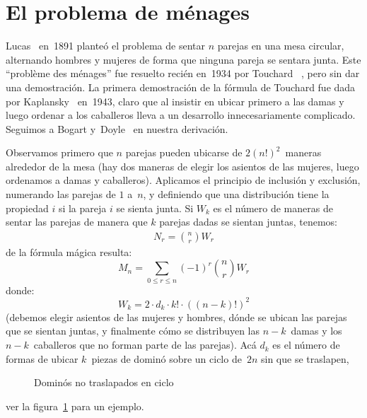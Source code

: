 \section{El problema de ménages}
\label{sec:menages}

  Lucas~\cite{lucas91:_theo_nombres} en~1891
  planteó el problema de sentar \(n\) parejas en una mesa circular,
  alternando hombres y mujeres
  de forma que ninguna pareja se sentara junta.
  Este ``problème des ménages''
  fue resuelto recién en~1934 por Touchard~%
    \cite{touchard34:_permutations},
  pero sin dar una demostración.
  La primera demostración de la fórmula de Touchard
  fue dada por Kaplansky~\cite{kaplansky43:_menages} en~1943,
  claro que al insistir en ubicar primero a las damas
  y luego ordenar a los caballeros
  lleva a un desarrollo innecesariamente complicado.
  Seguimos a Bogart y~Doyle~%
    \cite{bogart86:_non_sexist_soln_menage_probl}
  en nuestra derivación.

  Observamos primero que \(n\) parejas
  pueden ubicarse de \(2 (n!)^2\)~maneras alrededor de la mesa
  (hay dos maneras de elegir los asientos de las mujeres,
   luego ordenamos a damas y caballeros).
  Aplicamos el principio de inclusión y exclusión,
  numerando las parejas de \(1\) a~\(n\),
  y definiendo que una distribución tiene la propiedad \(i\)
  si la pareja \(i\) se sienta junta.
  Si \(W_k\) es el número de maneras de sentar las parejas
  de manera que \(k\) parejas dadas se sientan juntas,
  tenemos:
  \begin{align}
    \label{eq:menage:N}
    N_r
      = \binom{n}{r} W_r
  \end{align}
  de la fórmula mágica resulta:
  \begin{equation}
    \label{eq:menages:M}
    M_n
      = \sum_{0 \le r \le n} (-1)^r \binom{n}{r} W_r
  \end{equation}
  donde:
  \begin{equation}
    \label{eq:menages:W}
    W_k
      = 2 \cdot d_k \cdot k! \cdot \left( (n - k)! \right)^2
  \end{equation}
  (debemos elegir asientos de las mujeres y hombres,
   dónde se ubican las parejas que se sientan juntas,
   y finalmente cómo se distribuyen las \(n - k\)~damas
   y los \(n - k\)~caballeros que no forman parte de las parejas).
  Acá \(d_k\)
  es el número de formas de ubicar \(k\)~piezas de dominó
  sobre un ciclo de~\(2 n\)
  sin que se traslapen,
  \begin{figure}[ht]
    \centering
    \caption{Dominós no traslapados en ciclo}
    \label{fig:menage}
  \end{figure}
  ver la figura~\ref{fig:menage} para un ejemplo.


